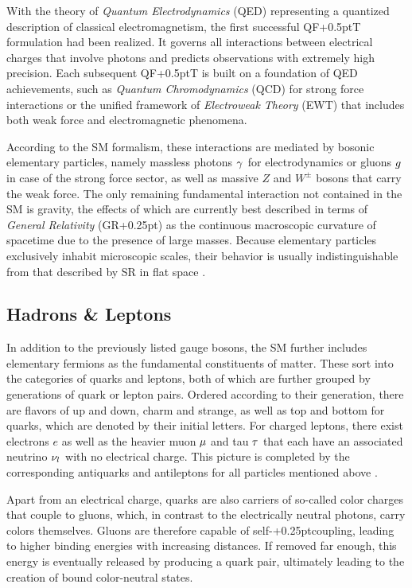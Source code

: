 With the theory of \emph{Quantum Electrodynamics} (QED) representing a quantized description of classical electromagnetism, the
first successful QF{\kern+0.5pt}T formulation had been realized. It governs all interactions between electrical charges that involve
photons and predicts observations with extremely high precision. Each subsequent QF{\kern+0.5pt}T is built on a foundation of QED
achievements, such as \emph{Quantum Chromodynamics} (QCD) for strong force interactions or the unified framework of
\emph{Electroweak Theory} (EWT) that includes both weak force and electromagnetic phenomena.

According to the SM formalism, these interactions are mediated by bosonic elementary particles, namely massless photons
$\gamma \kern+0.75pt$ for electrodynamics or gluons $\kern-0.5pt g$ in case of the strong force sector, as well as massive
$Z$ and $W^\pm$ bosons that carry the weak force. The only remaining fundamental interaction not contained in the SM is gravity,
the effects of which are currently best described in terms of \emph{General Relativity} (GR{\kern+0.25pt}) as the continuous
macroscopic curvature of spacetime due to the presence of large masses. Because elementary particles exclusively inhabit
microscopic scales, their behavior is usually indistinguishable from that described by SR in flat space \cite{Peskin_1995}.


\subsection{Hadrons \& Leptons}
\label{sub:hadrons}

In addition to the previously listed gauge bosons, the SM further includes elementary fermions as the fundamental constituents of
matter. These sort into the categories of quarks and leptons, both of which are further grouped by generations of quark or lepton
pairs. Ordered according to their generation, there are flavors of up and down, charm and strange, as well as top and bottom for
quarks, which are denoted by their initial letters. For charged leptons, there exist electrons $e$ as well as the heavier muon
$\kern-0.5pt \mu$ and tau $\kern-0.5pt \tau \kern+0.5pt$ that each have an associated neutrino $\nu_l \kern+0.5pt$ with no electrical
charge. This picture is completed by the corresponding antiquarks and antileptons for all particles mentioned above \cite{Halzen_1984}.

Apart from an electrical charge, quarks are also carriers of so-called color charges that couple to gluons, which, in contrast
to the electrically neutral photons, carry colors themselves. Gluons are therefore capable of self-{\kern+0.25pt}coupling,
leading to higher binding energies with increasing distances. If removed far enough, this energy is eventually
released by producing a quark pair, ultimately leading to the creation of bound color-neutral states.


